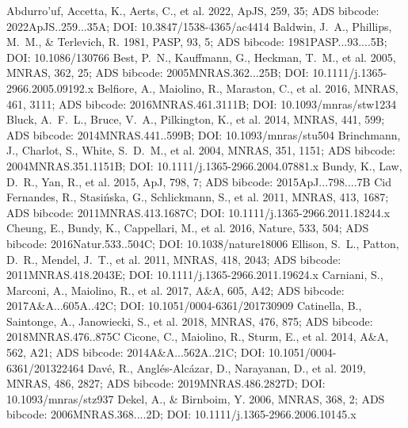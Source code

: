 \documentclass[twocolumn]{aastex631}
\begin{document}
\begin{thebibliography}{}
 Abdurro'uf, Accetta, K., Aerts, C., et al. 2022, ApJS, 259, 35; ADS bibcode: 2022ApJS..259...35A; DOI: 10.3847/1538-4365/ac4414
 Baldwin, J.~A., Phillips, M.~M., \& Terlevich, R. 1981, PASP, 93, 5; ADS bibcode: 1981PASP...93....5B; DOI: 10.1086/130766
 Best, P.~N., Kauffmann, G., Heckman, T.~M., et al. 2005, MNRAS, 362, 25; ADS bibcode: 2005MNRAS.362...25B; DOI: 10.1111/j.1365-2966.2005.09192.x
 Belfiore, A., Maiolino, R., Maraston, C., et al. 2016, MNRAS, 461, 3111; ADS bibcode: 2016MNRAS.461.3111B; DOI: 10.1093/mnras/stw1234
 Bluck, A.~F.~L., Bruce, V.~A., Pilkington, K., et al. 2014, MNRAS, 441, 599; ADS bibcode: 2014MNRAS.441..599B; DOI: 10.1093/mnras/stu504
 Brinchmann, J., Charlot, S., White, S.~D.~M., et al. 2004, MNRAS, 351, 1151; ADS bibcode: 2004MNRAS.351.1151B; DOI: 10.1111/j.1365-2966.2004.07881.x
 Bundy, K., Law, D.~R., Yan, R., et al. 2015, ApJ, 798, 7; ADS bibcode: 2015ApJ...798....7B
 Cid Fernandes, R., Stasi{\'n}ska, G., Schlickmann, S., et al. 2011, MNRAS, 413, 1687; ADS bibcode: 2011MNRAS.413.1687C; DOI: 10.1111/j.1365-2966.2011.18244.x
 Cheung, E., Bundy, K., Cappellari, M., et al. 2016, Nature, 533, 504; ADS bibcode: 2016Natur.533..504C; DOI: 10.1038/nature18006
 Ellison, S.~L., Patton, D.~R., Mendel, J.~T., et al. 2011, MNRAS, 418, 2043; ADS bibcode: 2011MNRAS.418.2043E; DOI: 10.1111/j.1365-2966.2011.19624.x
 Carniani, S., Marconi, A., Maiolino, R., et al. 2017, A\&A, 605, A42; ADS bibcode: 2017A&A...605A..42C; DOI: 10.1051/0004-6361/201730909
 Catinella, B., Saintonge, A., Janowiecki, S., et al. 2018, MNRAS, 476, 875; ADS bibcode: 2018MNRAS.476..875C
 Cicone, C., Maiolino, R., Sturm, E., et al. 2014, A\&A, 562, A21; ADS bibcode: 2014A&A...562A..21C; DOI: 10.1051/0004-6361/201322464
 Dav{\'e}, R., Angl{\'e}s-Alc{\'a}zar, D., Narayanan, D., et al. 2019, MNRAS, 486, 2827; ADS bibcode: 2019MNRAS.486.2827D; DOI: 10.1093/mnras/stz937
 Dekel, A., \& Birnboim, Y. 2006, MNRAS, 368, 2; ADS bibcode: 2006MNRAS.368....2D; DOI: 10.1111/j.1365-2966.2006.10145.x

\end{thebibliography}
\end{document}
